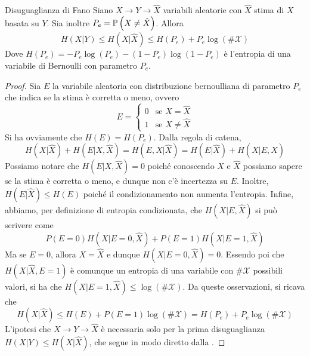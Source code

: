 \begin{theorem}[namedlabel={thm:fano}{Disuguaglianza di Fano}]{Disuguaglianza di Fano}
  Siano \(X \to Y \to \hat{X}\) variabili aleatorie con \(\hat{X}\) stima di \(X\) basata su \(Y\).
  Sia inoltre \(P_e = \Prob[X\neq\hat{X}]\). Allora
  \[H(X|Y) \leq H(X|\hat{X})\leq H(P_e)+P_e\log(\#\mathcal{X})\]
  Dove \(H(P_e) = -P_e \log (P_e) - (1-P_e)\log(1-P_e)\) è l'entropia di una variabile di Bernoulli con parametro \(P_e\).
\end{theorem}

\begin{proof}
  Sia \(E\) la variabile aleatoria con distribuzione bernoulliana di parametro \(P_e\) che indica se la stima è corretta o meno, ovvero
  \[E = \begin{cases}
    0 & \text{se } X = \hat{X} \\
    1 & \text{se } X \neq \hat{X}
  \end{cases}\]
  Si ha ovviamente che \(H(E) = H(P_e)\). 
  Dalla regola di catena,
  \[H(X|\hat{X})+H(E|X,\hat{X})=H(E,X|\hat{X}) = H(E|\hat{X}) + H(X|E,\hat{X})\]
  Possiamo notare che \(H(E|X,\hat{X})=0\) poiché conoscendo \(X\) e \(\hat{X}\) possiamo sapere se la stima è corretta o meno, e dunque non c'è incertezza su \(E\).
  Inoltre, \(H(E|\hat{X}) \leq H(E) \) poiché il condizionamento non aumenta l'entropia. 
  Infine, abbiamo, per definizione di entropia condizionata, che \(H(X|E,\hat{X})\) si può scrivere come
  \[P(E=0)H(X|E=0,\hat{X}) + P(E=1)H(X|E=1,\hat{X})\]
  Ma se \(E=0\), allora \(X=\hat{X}\) e dunque \(H(X|E=0,\hat{X})=0\).
  Essendo poi che \(H(X|\hat{X},E=1)\) è comunque un entropia di una variabile con \(\#\mathcal{X}\) possibili valori, si ha che \(H(X|E=1,\hat{X}) \leq \log(\#\mathcal{X})\).
  Da queste osservazioni, si ricava che
  \[H(X|\hat{X}) \leq H(E) + P(E=1) \log(\#\mathcal{X}) = H(P_e) + P_e \log(\#\mathcal{X})\]
  L'ipotesi che \(X \to Y \to \hat{X}\) è necessaria solo per la prima disuguaglianza \(H(X|Y) \leq H(X|\hat{X})\), che segue in modo diretto dalla .
\end{proof}

